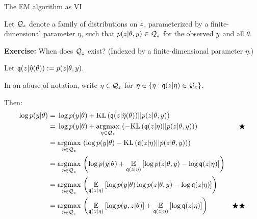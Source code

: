 \begin{frame}{The EM algorithm as VI}

Let $\mathcal{Q}_z$ denote a family of distributions on $z$, parameterized by a
finite-dimensional parameter $\eta$, such that $p(z | \theta, y) \in \mathcal{Q}_z$
for the observed $y$ and all $\theta$.

\textbf{Exercise:} When does $\mathcal{Q}_z$ exist?  (Indexed by a
finite-dimensional parameter $\eta$.)

Let $\mathfrak{q}(z | \hat{\eta}(\theta)) := p(z | \theta, y)$.

In an abuse of notation,
write $\eta \in \mathcal{Q}_z$ for $\eta \in \{\eta: \mathfrak{q}(z | \eta) \in \mathcal{Q}_z \}$.


Then:
%
\begin{align*}
%
\log p(\y | \theta) ={}&
\log p(\y | \theta) + \kl{\q(\z | \etaopt(\theta))}{p(\z | \theta, \y)}
\\={}&
\log p(\y | \theta) + \argmax{\eta \in \qdom_z}\left( -
    \kl{\q(\z | \eta)}{p(\z | \theta, \y)} \right) & \bigstar
\\={}&
\argmax{\eta \in \qdom_z} \left(
    \log p(\y | \theta) -
    \kl{\q(\z | \eta)}{p(\z | \theta, \y)}\right)
\\={}&
\argmax{\eta \in \qdom_z} \left(
\log p(\y | \theta) +
\expect{\q(\z | \eta)}{
    \log p(\z | \theta, \y) - \log \q(\z | \eta)
}\right)
\\={}&
\argmax{\eta \in \qdom_z} \left(
\expect{\q(\z | \eta)}{
    \log p(\y | \theta)
    \log p(\z | \theta, \y) -  \log \q(\z | \eta)
}\right)
\\={}&
\argmax{\eta \in \qdom_z} \left(
\expect{\q(\z | \eta)}{
    \log p(\y, \z | \theta) }
+ \expect{\q(\z | \eta)}{\log \q(\z | \eta)
}\right) & \bigstar\bigstar
%
\end{align*}
%
\end{frame}




